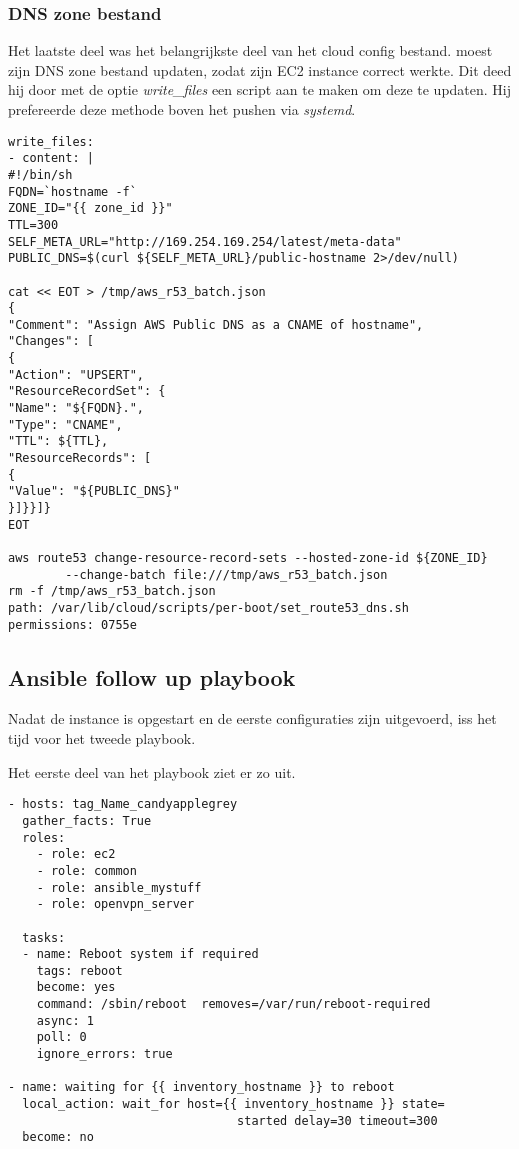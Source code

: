 \subsubsection{DNS zone bestand}
Het laatste deel was het belangrijkste deel van het cloud config bestand. \autocite{scottharney} moest zijn DNS zone bestand updaten, zodat zijn EC2 instance correct werkte. Dit deed hij door met de optie \textit{write\_files} een script aan te maken om deze te updaten. Hij prefereerde deze methode boven het pushen via \textit{systemd}.
\begin{lstlisting}[basicstyle=\small]
write_files:
- content: |
#!/bin/sh
FQDN=`hostname -f`
ZONE_ID="{{ zone_id }}"
TTL=300
SELF_META_URL="http://169.254.169.254/latest/meta-data"
PUBLIC_DNS=$(curl ${SELF_META_URL}/public-hostname 2>/dev/null)

cat << EOT > /tmp/aws_r53_batch.json
{
"Comment": "Assign AWS Public DNS as a CNAME of hostname",
"Changes": [
{
"Action": "UPSERT",
"ResourceRecordSet": {
"Name": "${FQDN}.",
"Type": "CNAME",
"TTL": ${TTL},
"ResourceRecords": [
{
"Value": "${PUBLIC_DNS}"
}]}}]}
EOT

aws route53 change-resource-record-sets --hosted-zone-id ${ZONE_ID} 
		--change-batch file:///tmp/aws_r53_batch.json
rm -f /tmp/aws_r53_batch.json
path: /var/lib/cloud/scripts/per-boot/set_route53_dns.sh
permissions: 0755e
\end{lstlisting}
\newpage
\subsection{Ansible follow up playbook}
Nadat de instance is opgestart en de eerste configuraties zijn uitgevoerd, iss het tijd voor het tweede playbook. 

Het eerste deel van het playbook ziet er zo uit.
\begin{lstlisting}[basicstyle=\small]
- hosts: tag_Name_candyapplegrey
  gather_facts: True
  roles:
    - role: ec2
    - role: common
    - role: ansible_mystuff
    - role: openvpn_server

  tasks:
  - name: Reboot system if required
    tags: reboot
    become: yes
    command: /sbin/reboot  removes=/var/run/reboot-required 
    async: 1
    poll: 0
    ignore_errors: true

- name: waiting for {{ inventory_hostname }} to reboot
  local_action: wait_for host={{ inventory_hostname }} state=
                                started delay=30 timeout=300 
  become: no
\end{lstlisting}

